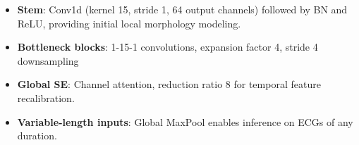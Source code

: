 \documentclass[a0paper,portrait]{baposter}
\begin{document}
\begin{poster}
{\vspace{-0.5ex}

\begin{itemize}
\item {\bf Stem}: Conv1d (kernel 15, stride 1, 64 output channels) followed by BN and ReLU, providing initial local morphology modeling.
\item {\bf Bottleneck blocks}: 1-15-1 convolutions, expansion factor 4, stride 4 downsampling
\item {\bf Global SE}: Channel attention, reduction ratio 8 for temporal feature recalibration.
\item {\bf Variable-length inputs}: Global MaxPool enables inference on ECGs of any duration.
\end{itemize}

}





\end{poster}
\end{document}
